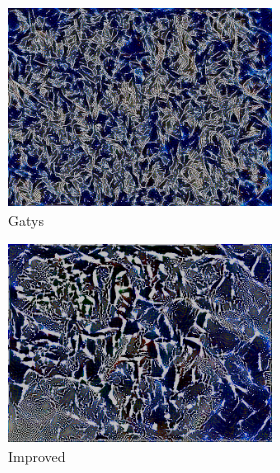 \begin{figure}[]
\begin{subfigure}{\textwidth}
\begin{subfigure}{0.19\textwidth}
            \centering
            \includegraphics[width=\textwidth]{images/04-experiment02/isolating_issues/190_gatys.jpg}
            \caption*{Gatys}
        \end{subfigure}
        \hfill
        \begin{subfigure}{0.19\textwidth}
            \centering
            \includegraphics[width=\textwidth]{images/04-experiment02/isolating_issues/190_improved.jpg}
            \caption*{Improved}
        \end{subfigure}
        \hfill
        \begin{subfigure}{0.19\textwidth}
            \centering

\end{subfigure}
\end{subfigure}
\end{figure}
